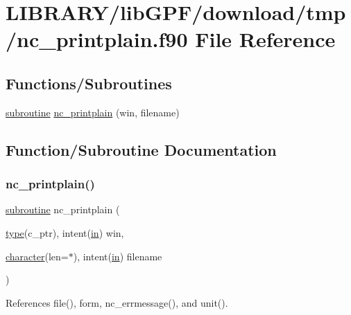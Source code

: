 \hypertarget{nc__printplain_8f90}{}\section{L\+I\+B\+R\+A\+R\+Y/lib\+G\+P\+F/download/tmp/nc\+\_\+printplain.f90 File Reference}
\label{nc__printplain_8f90}
\subsection*{Functions/\+Subroutines}
\begin{DoxyCompactItemize}
\item 
\hyperlink{M__stopwatch_83_8txt_acfbcff50169d691ff02d4a123ed70482}{subroutine} \hyperlink{nc__printplain_8f90_aba4329f91d99b9519c4f1da36ca2962f}{nc\+\_\+printplain} (win, filename)
\end{DoxyCompactItemize}


\subsection{Function/\+Subroutine Documentation}
\mbox{\label{nc__printplain_8f90_aba4329f91d99b9519c4f1da36ca2962f}} 
\subsubsection{\texorpdfstring{nc\+\_\+printplain()}{nc\_printplain()}}
{\footnotesize\ttfamily \hyperlink{M__stopwatch_83_8txt_acfbcff50169d691ff02d4a123ed70482}{subroutine} nc\+\_\+printplain (\begin{DoxyParamCaption}\item[{\hyperlink{stop__watch_83_8txt_a70f0ead91c32e25323c03265aa302c1c}{type}(c\+\_\+ptr), intent(\hyperlink{M__journal_83_8txt_afce72651d1eed785a2132bee863b2f38}{in})}]{win,  }\item[{\hyperlink{option__stopwatch_83_8txt_abd4b21fbbd175834027b5224bfe97e66}{character}(len=$\ast$), intent(\hyperlink{M__journal_83_8txt_afce72651d1eed785a2132bee863b2f38}{in})}]{filename }\end{DoxyParamCaption})}



References file(), form, nc\+\_\+errmessage(), and unit().

